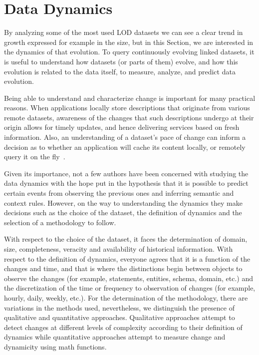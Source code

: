 \documentclass[sw]{iosart2x}
\begin{document}
\section{Data Dynamics}\label{Data}

By analyzing some of the most used LOD datasets we can see a clear trend in growth expressed for example in the size, but in this Section, we are interested in the dynamics of that evolution. To query continuously evolving linked datasets, it is useful to understand how datasets (or parts of them) evolve, and how this evolution is related to the data itself, to measure, analyze, and predict data evolution.

Being able to understand and characterize change is important for many practical reasons. When applications locally store descriptions that originate from various remote datasets, awareness of the changes that such descriptions undergo at their origin allows for timely updates, and hence delivering services based on fresh information. Also, an understanding of a dataset's pace of change can inform a decision as to whether an application will cache its content locally, or remotely query it on the fly~\cite{UmbrichKHP12, ekawUmbrichKHP12}.

Given its importance, not a few authors have been concerned with studying the data dynamics with the hope put in the hypothesis that it is possible to predict certain events from observing the previous ones and inferring semantic and context rules. However, on the way to understanding the dynamics they make decisions such as the choice of the dataset, the definition of dynamics and the selection of a methodology to follow.

With respect to the choice of the dataset, it faces the determination of domain, size, completeness, veracity and availability of historical information. With respect to the definition of dynamics, everyone agrees that it is a function of the changes and time, and that is where the distinctions begin between objects to observe the changes (for example, statements, entities, schema, domain, etc.) and the discretization of the time or frequency to observation of changes (for example, hourly, daily, weekly, etc.). For the determination of the methodology, there are variations in the methods used, nevertheless, we distinguish the presence of qualitative and quantitative approaches. Qualitative approaches attempt to detect changes at different levels of complexity according to their definition of dynamics while quantitative approaches attempt to measure change and dynamicity using math functions.
\end{document}
